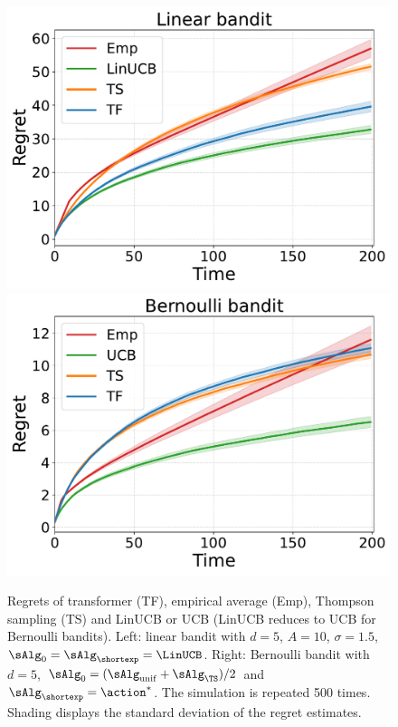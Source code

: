 \documentclass[10pt]{article}
\begin{document}




\begin{figure}[t]
\centering  %
\includegraphics[width=0.35\linewidth]{Sections/figs/record_2_cum_True.pdf}
\hspace{2em}
\includegraphics[width=0.35\linewidth]{Sections/figs/record_1_cum_True.pdf}
\vspace{-1em}
\caption{Regrets of transformer (TF), empirical average (Emp), Thompson sampling (TS) and LinUCB or UCB (LinUCB reduces to UCB for Bernoulli bandits). Left: linear bandit with $d=5$, $A=10$, $\sigma=1.5$, $\sAlg_0=\sAlg_\shortexp=\LinUCB$. Right: Bernoulli bandit with $d=5$, $\sAlg_0=(\sAlg_{\mathrm{unif}}+\sAlg_{\TS})/2$ and $\sAlg_\shortexp=\action^*$. The simulation is repeated 500 times. Shading displays the standard deviation of the regret estimates. } 
\label{fig:regret_1} 
\end{figure}
\end{document}
